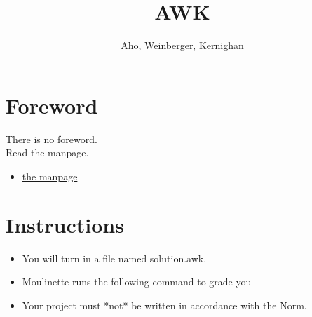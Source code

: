 \documentclass{42-en}
\begin{document}
\title{AWK}
\subtitle{Aho, Weinberger, Kernighan}

    \maketitle

    \tableofcontents

\newpage
\chapter{Foreword}

    There is no foreword.\\
    Read the manpage.\\

    \begin{itemize}\itemsep7pt

        \item \href{https://man.openbsd.org/awk}{the manpage}\\

    \end{itemize}

\newpage

\chapter{Instructions}

    \begin{itemize}

      \item You will turn in a file named solution.awk.
      \item Moulinette runs the following command to grade you
        \begin{42console}
%
        \end{42console}

      \item Your project must *not* be written in accordance with the Norm.

    \end{itemize}
\end{document}

